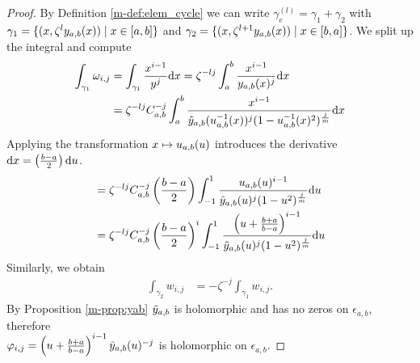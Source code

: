\documentclass[main.tex]{subfiles}
\begin{document}
  \begin{proof}
    By Definition \ref{m-def:elem_cycle} we can write $\gamma_e^{(l)} = \gamma_1 + \gamma_2$ with $\gamma_1 = \{  (x,\zeta^l y_{a,b}(x))  \mid  x \in [a,b]  \}$ and
    $\gamma_2 = \{  (x,\zeta^{l+1}y_{a,b}(x))  \mid  x \in [b,a]  \}$. We split up the integral and compute
    \begin{align}\label{eq:thm_periods_2}
     \int_{\gamma_1} \omega_{i,j}  & =  \int_{\gamma_1} \frac{x^{i-1}}{y^j}  \mathrm d x  =  \zeta^{-lj} \int_a^b \frac{x^{i-1}}{y_{a,b}(x)^j}  \mathrm d x \\  & =
     \zeta^{-lj} C_{a,b}^{-j}   \int_a^b \frac{x^{i-1}}{\tilde{y}_{a,b}(u_{a,b}^{-1}(x))^j (1-u_{a,b}^{-1}(x)^2)^{\frac{j}{m}}}  \mathrm d x
  \end{align}
  Applying the transformation $x \mapsto u_{a,b}(u)$ introduces the derivative $\mathrm d x = \left(\frac{b-a}{2}\right) \mathrm d u$.
  \begin{align}
   & = \zeta^{-lj} C_{a,b}^{-j} \left(\frac{b-a}{2}\right) \int_{-1}^1 \frac{u_{a,b}(u)^{i-1}}{\tilde{y}_{a,b}(u)^j (1-u^2)^{\frac{j}{m}}}  \mathrm d u \\ & = 
    \zeta^{-lj} C_{a,b}^{-j} \left(\frac{b-a}{2}\right)^i \int_{-1}^1 \frac{\left(u+\frac{b+a}{b-a}\right)^{i-1}}{\tilde{y}_{a,b}(u)^j (1-u^2)^{\frac{j}{m}}}  \mathrm d u
  \end{align}
  Similarly, we obtain
  \begin{align}
        \int_{\gamma_2} w_{i,j}  & =  -\zeta^{-j} \int_{\gamma_1} w_{i,j}.
  \end{align}
  By Proposition \ref{m-prop:yab} $\tilde{y}_{a,b}$ is holomorphic and has no zeros on $\epsilon_{a,b}$, therefore \\ $\varphi_{i,j}  = \left(u+\frac{b+a}{b-a}\right)^{i-1} \tilde{y}_{a,b}(u)^{-j}$
  is holomorphic on $\epsilon_{a,b}$.

  \end{proof}
\end{document}

